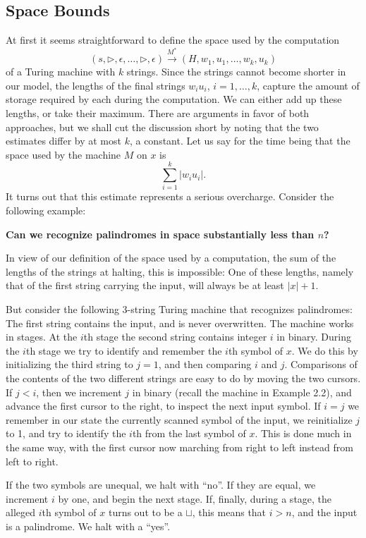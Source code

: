 \documentclass[12pt]{article}
\begin{document}
\subsection{Space Bounds}
At first it seems straightforward to define the space used by the computation 
\[
(s, \triangleright, \epsilon, \ldots, \triangleright, \epsilon) \xrightarrow{M^*} (H, w_1, u_1, \ldots, w_k, u_k)
\]
of a Turing machine with $k$ strings. Since the strings cannot become shorter in our model, the lengths of the final strings $w_i u_i$, $i = 1, \ldots, k$, capture the amount of storage required by each during the computation. We can either add up these lengths, or take their maximum. There are arguments in favor of both approaches, but we shall cut the discussion short by noting that the two estimates differ by at most $k$, a constant. Let us say for the time being that the space used by the machine $M$ on $x$ is 
\[
\sum_{i=1}^k |w_i u_i|.
\]
It turns out that this estimate represents a serious overcharge. Consider the following example:

\begin{tcolorbox}[colback=white, colframe=black, title=Example]
\textbf{Can we recognize palindromes in space substantially less than $n$?} 

In view of our definition of the space used by a computation, the sum of the lengths of the strings at halting, this is impossible: One of these lengths, namely that of the first string carrying the input, will always be at least $|x| + 1$.

But consider the following 3-string Turing machine that recognizes palindromes: The first string contains the input, and is never overwritten. The machine works in stages. At the $i$th stage the second string contains integer $i$ in binary. During the $i$th stage we try to identify and remember the $i$th symbol of $x$. We do this by initializing the third string to $j = 1$, and then comparing $i$ and $j$. Comparisons of the contents of the two different strings are easy to do by moving the two cursors. If $j < i$, then we increment $j$ in binary (recall the machine in Example 2.2), and advance the first cursor to the right, to inspect the next input symbol. If $i = j$ we remember in our state the currently scanned symbol of the input, we reinitialize $j$ to 1, and try to identify the $i$th from the last symbol of $x$. This is done much in the same way, with the first cursor now marching from right to left instead from left to right.

If the two symbols are unequal, we halt with ``no''. If they are equal, we increment $i$ by one, and begin the next stage. If, finally, during a stage, the alleged $i$th symbol of $x$ turns out to be a $\sqcup$, this means that $i > n$, and the input is a palindrome. We halt with a ``yes''.
\end{tcolorbox}
\end{document}
